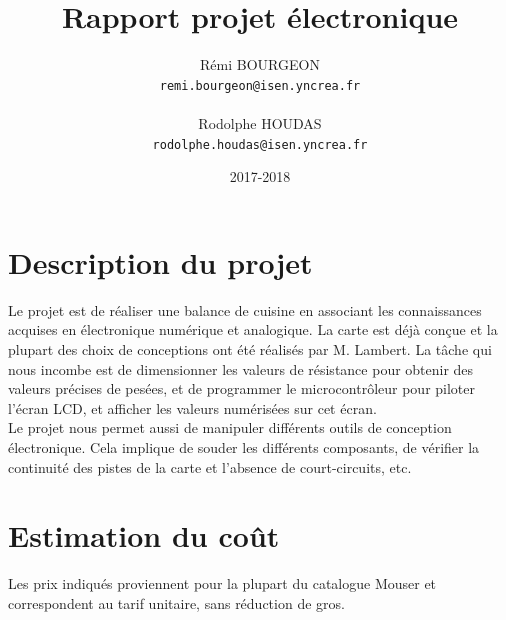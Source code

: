 \documentclass[a4paper,11pt,titlepage]{article}
\title{Rapport projet électronique}
\author{Rémi BOURGEON\\
\texttt{remi.bourgeon@isen.yncrea.fr}\\\\
Rodolphe HOUDAS\\
\texttt{rodolphe.houdas@isen.yncrea.fr}}
\date{2017-2018}
\begin{document}
\maketitle
\tableofcontents
\newpage


\section{Description du projet}

Le projet est de réaliser une balance de cuisine en associant les connaissances acquises en électronique numérique et analogique. La carte est déjà conçue et la plupart des choix de conceptions ont été réalisés par M. Lambert. La tâche qui nous incombe est de dimensionner les valeurs de résistance pour obtenir des valeurs précises de pesées, et de programmer le microcontrôleur pour piloter l'écran LCD, et afficher les valeurs numérisées sur cet écran.\\

Le projet nous permet aussi de manipuler différents outils de conception électronique. Cela implique de souder les différents composants, de vérifier la continuité des pistes de la carte et l'absence de court-circuits, etc. 

\section{Estimation du coût}

Les prix indiqués proviennent pour la plupart du catalogue Mouser et correspondent au tarif unitaire, sans réduction de gros.\\
\end{document}
